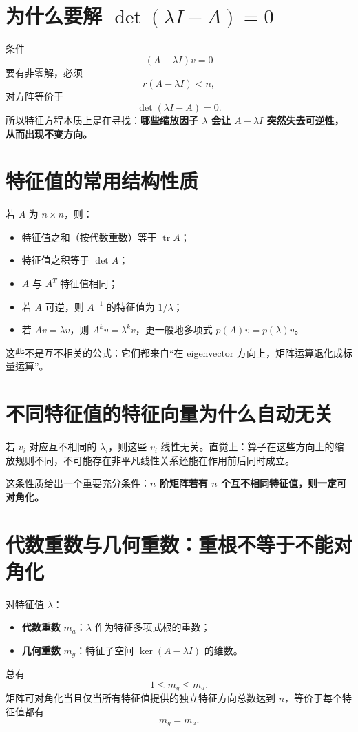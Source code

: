 \documentclass[11pt,a4paper,openany]{ctexbook}
\newcommand{\key}[1]{\textbf{\color{deep}#1}}
\begin{document}
\section{为什么要解 \texorpdfstring{$\det(\lambda I-A)=0$}{det(lambda I - A) = 0}}
条件
\[
(A-\lambda I)v=0
\]
要有非零解，必须
\[
r(A-\lambda I)<n,
\]
对方阵等价于
\[
\boxed{\det(\lambda I-A)=0}.
\]
所以特征方程本质上是在寻找：\key{哪些缩放因子 $\lambda$ 会让 $A-\lambda I$ 突然失去可逆性，从而出现不变方向。}

\section{特征值的常用结构性质}
若 $A$ 为 $n\times n$，则：
\begin{itemize}
  \item 特征值之和（按代数重数）等于 $\operatorname{tr}A$；
  \item 特征值之积等于 $\det A$；
  \item $A$ 与 $A^T$ 特征值相同；
  \item 若 $A$ 可逆，则 $A^{-1}$ 的特征值为 $1/\lambda$；
  \item 若 $Av=\lambda v$，则 $A^kv=\lambda^kv$，更一般地多项式 $p(A)v=p(\lambda)v$。
\end{itemize}
这些不是互不相关的公式：它们都来自“在 eigenvector 方向上，矩阵运算退化成标量运算”。

\section{不同特征值的特征向量为什么自动无关}
若 $v_i$ 对应互不相同的 $\lambda_i$，则这些 $v_i$ 线性无关。直觉上：算子在这些方向上的缩放规则不同，不可能存在非平凡线性关系还能在作用前后同时成立。

这条性质给出一个重要充分条件：\key{$n$ 阶矩阵若有 $n$ 个互不相同特征值，则一定可对角化。}

\section{代数重数与几何重数：重根不等于不能对角化}
对特征值 $\lambda$：
\begin{itemize}
  \item \key{代数重数} $m_a$：$\lambda$ 作为特征多项式根的重数；
  \item \key{几何重数} $m_g$：特征子空间 $\ker(A-\lambda I)$ 的维数。
\end{itemize}
总有
\[
1\le m_g\le m_a.
\]
矩阵可对角化当且仅当所有特征值提供的独立特征方向总数达到 $n$，等价于每个特征值都有
\[
m_g=m_a.
\]
\end{document}
